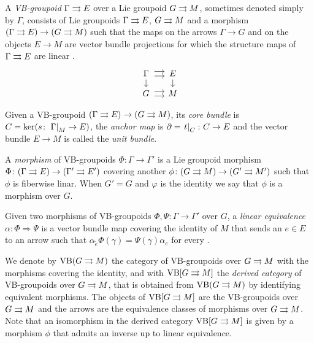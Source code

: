 %
%

A \emph{VB-groupoid} $\Gamma\rightrightarrows E$ over a Lie groupoid $G\rightrightarrows M$, sometimes denoted simply by $\Gamma$, consists of Lie groupoids $\Gamma\rightrightarrows E$, $G\rightrightarrows M$ and a morphism $(\Gamma\rightrightarrows E)\to (G\rightrightarrows M)$ such that the maps on the arrows $\Gamma\to G$ and on the objects $E\to M$ are vector bundle projections for which the structure maps of $\Gamma\rightrightarrows E$ are linear \cite{mack05}.
\begin{equation}
\begin{tikzcd}[sep=small, cells={text width={width("$M$")}}, align=center]
  \Gamma \ar[yshift=3pt]{r} \ar[yshift=-2.3pt]{r} \ar{d} & E \ar{d} \\
  G \ar[yshift=3pt]{r} \ar[yshift=-2.3pt]{r} & M
\end{tikzcd}
\end{equation}

Given a VB-groupoid $(\Gamma\rightrightarrows E)\to (G\rightrightarrows M)$, its \emph{core bundle} is $C=\ker(s\colon\left.\Gamma\right|_{M}\to E)$, the \emph{anchor map} is $\partial=\left.t\right|_{C}\colon C\to E$ and the vector bundle $E\to M$ is called the \emph{unit bundle}.

A \emph{morphism} of VB-groupoids $\Phi\colon\Gamma\to\Gamma'$ is a Lie groupoid morphism $\Phi\colon(\Gamma\rightrightarrows E)\to(\Gamma'\rightrightarrows E')$ covering another $\phi\colon(G\rightrightarrows M)\to (G'\rightrightarrows M')$ such that $\phi$ is fiberwise linar.
When $G'=G$ and $\varphi$ is the identity we say that $\phi$ is a morphism over $G$.

Given  two morphisms of VB-groupoids $\Phi,\Psi\colon\Gamma\to \Gamma'$ over $G$, a \emph{linear equivalence}
$\alpha\colon\Phi\Rightarrow\Psi$ is a vector bundle map  covering the identity of $M$
that sends an $e\in E$ to an arrow  such that $\alpha_{\tilde e} \Phi(\gamma) = \Psi(\gamma) \alpha_e$ for every .

We denote by $\mathrm{VB}(G\rightrightarrows M)$ the category of VB-groupoids over $G\rightrightarrows M$ with the morphisms covering the identity, and with $\mathrm{VB}[G\rightrightarrows M]$ the \emph{derived category} of VB-groupoids over $G\rightrightarrows M$, that is obtained from $\mathrm{VB}(G\rightrightarrows M)$ by identifying equivalent morphisms.
The objects of $\mathrm{VB}[G\rightrightarrows M]$ are the VB-groupoids over $G\rightrightarrows M$ and the arrows are the equivalence classes of morphisms over $G\rightrightarrows M$.
Note that an isomorphism in the derived category $\mathrm{VB}[G\rightrightarrows M]$ is given by a morphism $\phi$ that admits an inverse up to linear equivalence.

